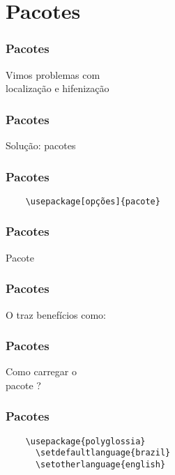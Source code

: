 \section{Pacotes}

\begin{frame}
  \frametitle{Pacotes}
  \LARGE
  Vimos problemas com\\
  localização e hifenização
\end{frame}

\begin{frame}
  \frametitle{Pacotes}
  \LARGE
  Solução: pacotes
\end{frame}

\begin{frame}[fragile]
  \frametitle{Pacotes}
  \begin{verbatim}
    \usepackage[opções]{pacote}
  \end{verbatim}
\end{frame}

\begin{frame}
  \frametitle{Pacotes}
  \LARGE
  Pacote 
\end{frame}

\begin{frame}
  \frametitle{Pacotes}
  \LARGE
  O  traz benefícios como:
  \begin{itemize}
  \end{itemize}
\end{frame}

\begin{frame}
  \frametitle{Pacotes}
  \LARGE
  Como carregar o\\
  pacote ?
\end{frame}

\begin{frame}[fragile]
  \frametitle{Pacotes}
  \begin{verbatim}
    \usepackage{polyglossia}
      \setdefaultlanguage{brazil}
      \setotherlanguage{english}
  \end{verbatim}
\end{frame}

